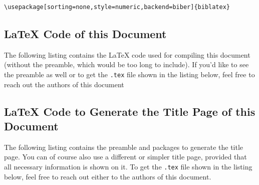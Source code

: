 \begin{lstlisting}
\usepackage[sorting=none,style=numeric,backend=biber]{biblatex}
\end{lstlisting}

\subsection{\LaTeX{} Code of this Document}
The following listing contains the \LaTeX{} code used for compiling this document (without the preamble, which would be too long to include). If you'd like to see the preamble as well or to get the \texttt{.tex} file shown in the listing below, feel free to reach out the authors of this document


\subsection{\LaTeX{} Code to Generate the Title Page of this Document}
The following listing contains the preamble and packages to generate the title page. You can of course also use a different or simpler title page, provided that all necessary information is shown on it. To get the \texttt{.tex} file shown in the listing below, feel free to reach out either to the authors of this document.

% 

\newpage
\printbibliography

\newpage
\printglossaries
